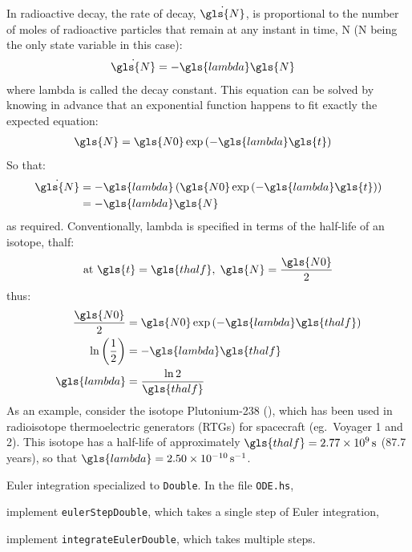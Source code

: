 \documentclass[12pt,openany]{book}
\begin{document}
In radioactive decay, the rate of decay, \(\dot{\gls{N}}\), is proportional to the number of moles of radioactive particles that remain at any instant in time, \gls{N} (\gls{N} being the only state variable in this case):
\begin{align}
  \dot{\gls{N}} &= -\gls{lambda}\gls{N}
\end{align}
where \gls{lambda} is called the decay constant. This equation can be solved by knowing in advance that an exponential function happens to fit exactly the expected equation:
\begin{align}
  \gls{N} &= \gls{N0} \exp\left({-\gls{lambda}\gls{t}}\right)
\end{align}
So that:
\begin{align}
  \dot{\gls{N}} &= -\gls{lambda}\left(\gls{N0}\exp\left({-\gls{lambda}\gls{t}}\right)\right) \\
                &= -\gls{lambda}\gls{N}
\end{align}
as required. Conventionally, \gls{lambda} is specified in terms of the half-life of an isotope, \gls{thalf}:
\begin{align}
  \textrm{at } \gls{t} = \gls{thalf} ,\; \gls{N} = \frac{\gls{N0}}{2}
\end{align}
thus:
\begin{align}
  \frac{\gls{N0}}{2} &= \gls{N0}\exp\left({-\gls{lambda}\gls{thalf}}\right) \\
  \ln\left(\frac{1}{2}\right) &= -\gls{lambda}\gls{thalf} \\
  \gls{lambda} &= \frac{\ln 2}{\gls{thalf}}
\end{align}
As an example, consider the isotope Plutonium-238 (), which has been used in radioisotope thermoelectric generators (RTGs) for spacecraft (eg.\ Voyager 1 and 2). This isotope has a half-life of approximately \(\gls{thalf}=\SI{2.77e9}{\s}\) (87.7 years), so that \(\gls{lambda}=\SI{2.50e-10}{\per\s}\).

\begin{problem}[label=eulerStepDouble]{Euler integration specialized to \texttt{Double}.}
  In the file \texttt{ODE.hs},
  \begin{compactitem}
  \item implement \texttt{eulerStepDouble}, which takes a single step of Euler integration,
  \item implement \texttt{integrateEulerDouble}, which takes multiple steps.
  \end{compactitem}
\end{problem}
\end{document}
